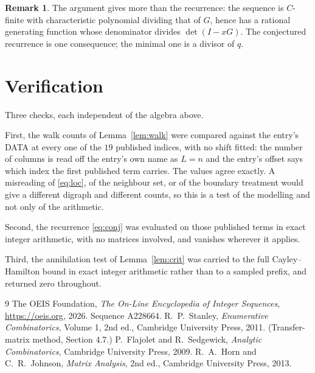 \documentclass[11pt,a4paper]{article}
\theoremstyle{plain}
\theoremstyle{definition}
\newtheorem{remark}[theorem]{Remark}
\begin{document}
\begin{remark}
The argument gives more than the recurrence: the sequence is $C$-finite with characteristic
polynomial dividing that of $G$, hence has a rational generating function whose denominator
divides $\det(I-xG)$. The conjectured recurrence is one consequence; the minimal one is a
divisor of $q$.
\end{remark}

\section{Verification}

Three checks, each independent of the algebra above.

First, the walk counts of Lemma~\ref{lem:walk} were compared against the entry's DATA at
every one of the $19$ published indices, with no shift fitted: the number of columns is
read off the entry's own name as $L=n$ and the entry's offset says which index the first
published term carries. The values agree exactly. A misreading of \eqref{eq:loc}, of the
neighbour set, or of the boundary treatment would give a different digraph and different
counts, so this is a test of the modelling and not only of the arithmetic.

Second, the recurrence \eqref{eq:conj} was evaluated on those published terms in exact
integer arithmetic, with no matrices involved, and vanishes wherever it applies.

Third, the annihilation test of Lemma~\ref{lem:crit} was carried to the full
Cayley--Hamilton bound in exact integer arithmetic rather than to a sampled prefix, and
returned zero throughout.

\begin{thebibliography}{9}
 The OEIS Foundation, \emph{The On-Line Encyclopedia of Integer
Sequences}, \url{https://oeis.org}, 2026. Sequence A228664.
 R.~P.~Stanley, \emph{Enumerative Combinatorics}, Volume 1, 2nd ed.,
Cambridge University Press, 2011. (Transfer-matrix method, Section 4.7.)
 P.~Flajolet and R.~Sedgewick, \emph{Analytic Combinatorics}, Cambridge
University Press, 2009.
 R.~A.~Horn and C.~R.~Johnson, \emph{Matrix Analysis}, 2nd ed., Cambridge
University Press, 2013.
\end{thebibliography}
\end{document}
